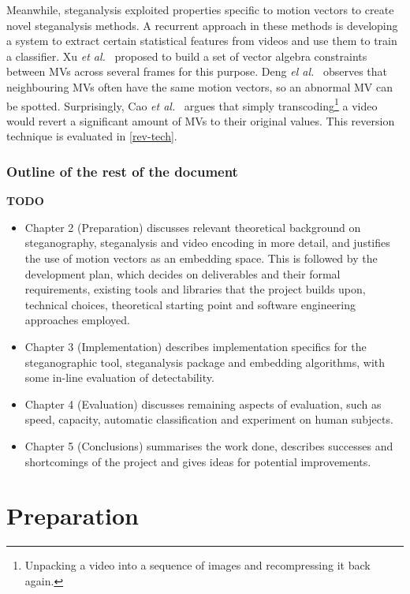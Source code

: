 \documentclass[12pt,british,twoside,notitlepage,usenames,dvipsnames,hypens,final]{report}
\numberwithin{equation}{section}
\numberwithin{figure}{section}
\begin{document}
Meanwhile, steganalysis exploited properties specific to motion vectors to create novel steganalysis methods. A recurrent approach in these methods is developing a system to extract certain statistical features from videos and use them to train a classifier. Xu \emph{et al.}~\cite{xu2013video} proposed to build a set of vector algebra constraints between MVs across several frames for this purpose. Deng \emph{el al.}~\cite{deng2012digital} observes that neighbouring MVs often have the same motion vectors, so an abnormal MV can be spotted. Surprisingly, Cao \emph{et al.}~\cite{cao2012video} argues that simply transcoding\footnote{Unpacking a video into a sequence of images and recompressing it back again.} a video would revert a significant amount of MVs to their original values. This reversion technique is evaluated in \ref{rev-tech}.

\subsection*{Outline of the rest of the document}
\textbf{TODO}
\begin{itemize}
\item Chapter 2 (Preparation) discusses relevant theoretical background on steganography, steganalysis and video encoding in more detail, and justifies the use of motion vectors as an embedding space. This is followed by the development plan, which decides on deliverables and their formal requirements, existing tools and libraries that the project builds upon, technical choices, theoretical starting point and software engineering approaches employed.
\item Chapter 3 (Implementation) describes implementation specifics for the steganographic tool, steganalysis package and embedding algorithms, with some in-line evaluation of detectability.
\item Chapter 4 (Evaluation) discusses remaining aspects of evaluation, such as speed, capacity, automatic classification and experiment on human subjects.
\item Chapter 5 (Conclusions) summarises the work done, describes successes and shortcomings of the project and gives ideas for potential improvements.
\end{itemize}
 

\cleardoublepage
\chapter{Preparation}
\end{document}
